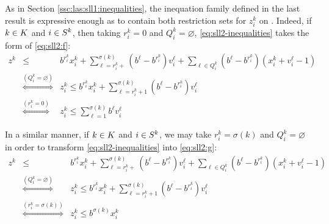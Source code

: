 As in Section \ref{ssc:las:sll1:inequalities}, the inequation family defined in
the last result is expressive enough as to contain both restriction sets for
$z_i^k$ on \sllb. Indeed, if ${k \in K}$ and ${i \in S^k}$, then taking $r_i^k = 0$ and $Q_i^k
= \varnothing$, \eqref{eq:sll2-inequalities} takes the form of
\eqref{eq:sll2:f}:
\begin{eqnarray*}
    z^k&\leq&
        b^{r_i^k}x_i^k
        + \sum_{\ell=r_i^k+}^{\sigma(k)}
            \left(b^\ell - b^{r_i^k}\right) v_i^\ell
        + \sum_{\ell\in Q_i^k}
            \left(b^\ell - b^{r_i^k}\right) \left(x_i^k+v_i^\ell-1\right)\\
       &\stackrel{(Q_i^k = \varnothing)}{\iff}& z_i^k \leq
           b^{r_i^k} x_i^k
           + \sum_{\ell = r_i^k + 1}^{\sigma(k)}
               \left(b^\ell - b^{r_i^k}\right)v_i^\ell\\
       &\stackrel{(r_i^k = 0)}{\iff}& z_i^k \leq
           \sum_{\ell = 1}^{\sigma(k)}
               b^\ell v_i^\ell
\end{eqnarray*}

In a similar manner, if ${k \in K}$ and ${i \in S^k}$, we may take $r_i^k = \sigma(k)$ and
$Q_i^k = \varnothing$ in order to transform \eqref{eq:sll2-inequalities} into
\eqref{eq:sll2:g}:
\begin{eqnarray*}
    z^k&\leq&
        b^{r_i^k}x_i^k
        + \sum_{\ell=r_i^k+}^{\sigma(k)}
            \left(b^\ell - b^{r_i^k}\right) v_i^\ell
        + \sum_{\ell\in Q_i^k}
            \left(b^\ell - b^{r_i^k}\right) \left(x_i^k+v_i^\ell-1\right)\\
       &\stackrel{(Q_i^k = \varnothing)}{\iff}& z_i^k \leq
           b^{r_i^k} x_i^k
           + \sum_{\ell = r_i^k + 1}^{\sigma(k)}
               \left(b^\ell - b^{r_i^k}\right) v_i^\ell\\
       &\stackrel{(r_i^k = \sigma(k))}{\iff}& z_i^k \leq
           b^{\sigma(k)} x_i^k
\end{eqnarray*}
